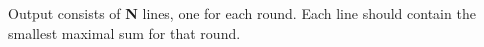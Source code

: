 Output consists of \textbf{N} lines, one for each round. Each line should contain the smallest maximal sum for that round.
